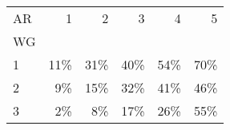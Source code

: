 \begin{tabular}{lrrrrr}
\toprule
AR &   1 &   2 &   3 &   4 &   5 \\
WG &     &     &     &     &     \\
\midrule
1  & 11\% & 31\% & 40\% & 54\% & 70\% \\
2  &  9\% & 15\% & 32\% & 41\% & 46\% \\
3  &  2\% &  8\% & 17\% & 26\% & 55\% \\
\bottomrule
\end{tabular}
